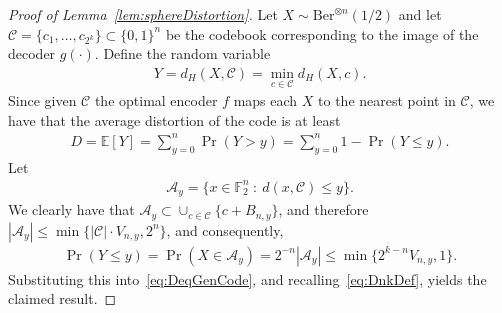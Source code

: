 \documentclass[article,doublecolumn]{IEEEtran}
\newcommand{\F}{{\mathbb{F}}}
\newcommand{\EE}{{\mathbb{E}}}
\newcommand{\A}{{\mathcal{A}}}
\newcommand{\CC}{{\mathcal{C}}}
\begin{document}
\begin{proof}[Proof of Lemma~\ref{lem:sphereDistortion}]
Let $X\sim\mathrm{Ber}^{\otimes n}(1/2)$ and let $\CC=\{c_1,\ldots,c_{2^k}\}\subset\{0,1\}^n$ be the codebook corresponding to the image of the decoder $g(\cdot)$. Define the random variable
\begin{align}
Y=d_H(X,\CC)=\min_{c\in\CC}d_H(X,c).    
\end{align}
Since given $\CC$ the optimal encoder $f$ maps each $X$ to the nearest point in $\CC$, we have that the average distortion of the code is at least
\begin{align}
D=\EE[Y]=\sum_{y=0}^n\Pr(Y>y)=\sum_{y=0}^n 1-\Pr(Y\leq y). 
\label{eq:DeqGenCode}
\end{align}
Let
\begin{align}
\A_y=\{x\in\F_2^n~:~d(x,\CC)\leq y\}.   
\end{align}
We clearly have that $\A_y\subset \cup_{c\in\CC}\{c+B_{n,y}\}$, and therefore $|\A_y|\leq \min\{|\CC|\cdot V_{n,y},2^n\}$, and consequently,
\begin{align}
\Pr(Y\leq y)=\Pr(X\in \A_y)=2^{-n}|\A_y|\leq \min\{2^{k-n}V_{n,y},1\}.   \end{align}
Substituting this into~\eqref{eq:DeqGenCode}, and recalling~\eqref{eq:DnkDef}, yields the claimed result.
\end{proof}



\end{document}
